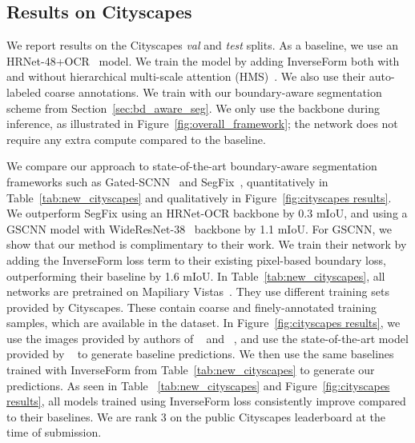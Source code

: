 \documentclass[final]{cvpr}
\begin{document}
\subsection{Results on Cityscapes}
We report results on the Cityscapes \textit{val} and \textit{test} splits. As a baseline, we use an HRNet-48+OCR~\cite{yuan2020objectcontextual} model. We train the model by adding InverseForm both with and without hierarchical multi-scale attention (HMS)~\cite{tao2020hierarchical}. We also use their auto-labeled coarse annotations. We train with our boundary-aware segmentation scheme from Section~\ref{sec:bd_aware_seg}. We only use the backbone during inference, as illustrated in Figure~\ref{fig:overall_framework}; the network does not require any extra compute compared to the baseline.

We compare our approach to state-of-the-art boundary-aware segmentation frameworks such as Gated-SCNN~\cite{takikawa2019gated} and SegFix~\cite{yuan2020segfix}, quantitatively in Table~\ref{tab:new_cityscapes} and qualitatively in Figure~\ref{fig:cityscapes results}. We outperform SegFix using an HRNet-OCR backbone by 0.3 mIoU, and using a GSCNN model with WideResNet-38~\cite{zagoruyko2017wide} backbone by 1.1 mIoU. For GSCNN, we show that our method is complimentary to their work. We train their network by adding the InverseForm loss term to their existing pixel-based boundary loss, outperforming their baseline by 1.6 mIoU. In Table~\ref{tab:new_cityscapes}, all networks are pretrained on Mapiliary Vistas~\cite{mapiliary}. They use different training sets provided by Cityscapes. These contain coarse and finely-annotated training samples, which are available in the dataset. In Figure~\ref{fig:cityscapes results}, we use the images provided by authors of ~\cite{yuan2020segfix} and ~\cite{takikawa2019gated}, and use the state-of-the-art model provided by ~\cite{tao2020hierarchical} to generate baseline predictions. We then use the same baselines trained with InverseForm from Table~\ref{tab:new_cityscapes} to generate our predictions. As seen in Table ~\ref{tab:new_cityscapes} and Figure~\ref{fig:cityscapes results}, all models trained using InverseForm loss consistently improve compared to their baselines. We are rank 3 on the public Cityscapes leaderboard at the time of submission.
\end{document}

